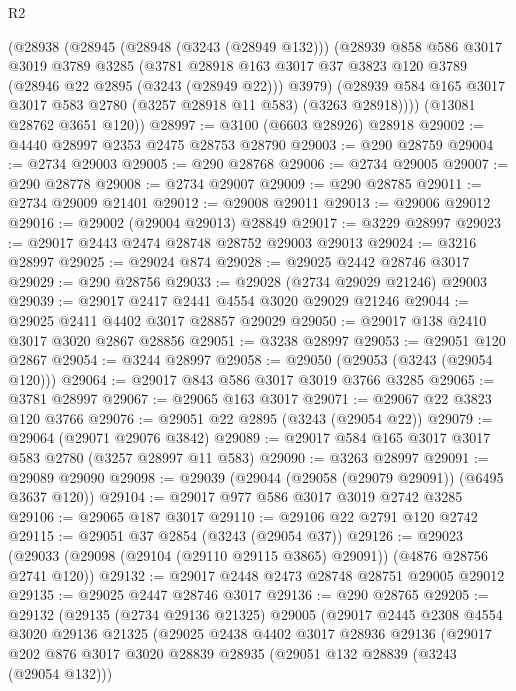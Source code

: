 \begin{lexlean}{R2}
\begin{coremodule}
    (@28938
      (@28945
        (@28948 (@3243 (@28949 @132)))
        (@28939
          @858
          @586
          @3017
          @3019
          @3789
          @3285
          (@3781
            @28918
            @163
            @3017
            @37
            @3823
            @120
            @3789
            (@28946 @22 @2895 (@3243 (@28949 @22)))
            @3979)
          (@28939 @584 @165 @3017 @3017 @583 @2780 (@3257 @28918 @11 @583) (@3263 @28918))))
      (@13081 @28762 @3651 @120))
@28997 := @3100 (@6603 @28926) @28918
@29002 := @4440 @28997 @2353 @2475 @28753 @28790
@29003 := @290 @28759
@29004 := @2734 @29003
@29005 := @290 @28768
@29006 := @2734 @29005
@29007 := @290 @28778
@29008 := @2734 @29007
@29009 := @290 @28785
@29011 := @2734 @29009 @21401
@29012 := @29008 @29011
@29013 := @29006 @29012
@29016 := @29002 (@29004 @29013) @28849
@29017 := @3229 @28997
@29023 := @29017 @2443 @2474 @28748 @28752 @29003 @29013
@29024 := @3216 @28997
@29025 := @29024 @874
@29028 := @29025 @2442 @28746 @3017
@29029 := @290 @28756
@29033 := @29028 (@2734 @29029 @21246) @29003
@29039 := @29017 @2417 @2441 @4554 @3020 @29029 @21246
@29044 := @29025 @2411 @4402 @3017 @28857 @29029
@29050 := @29017 @138 @2410 @3017 @3020 @2867 @28856
@29051 := @3238 @28997
@29053 := @29051 @120 @2867
@29054 := @3244 @28997
@29058 := @29050 (@29053 (@3243 (@29054 @120)))
@29064 := @29017 @843 @586 @3017 @3019 @3766 @3285
@29065 := @3781 @28997
@29067 := @29065 @163 @3017
@29071 := @29067 @22 @3823 @120 @3766
@29076 := @29051 @22 @2895 (@3243 (@29054 @22))
@29079 := @29064 (@29071 @29076 @3842)
@29089 := @29017 @584 @165 @3017 @3017 @583 @2780 (@3257 @28997 @11 @583)
@29090 := @3263 @28997
@29091 := @29089 @29090
@29098 := @29039 (@29044 (@29058 (@29079 @29091)) (@6495 @3637 @120))
@29104 := @29017 @977 @586 @3017 @3019 @2742 @3285
@29106 := @29065 @187 @3017
@29110 := @29106 @22 @2791 @120 @2742
@29115 := @29051 @37 @2854 (@3243 (@29054 @37))
@29126 := @29023 (@29033 (@29098 (@29104 (@29110 @29115 @3865) @29091)) (@4876 @28756 @2741 @120))
@29132 := @29017 @2448 @2473 @28748 @28751 @29005 @29012
@29135 := @29025 @2447 @28746 @3017
@29136 := @290 @28765
@29205 := @29132
    (@29135
      (@2734 @29136 @21325)
      @29005
      (@29017
        @2445
        @2308
        @4554
        @3020
        @29136
        @21325
        (@29025
          @2438
          @4402
          @3017
          @28936
          @29136
          (@29017
            @202
            @876
            @3017
            @3020
            @28839
            @28935
            (@29051 @132 @28839 (@3243 (@29054 @132)))

\end{coremodule}
\end{lexlean}
